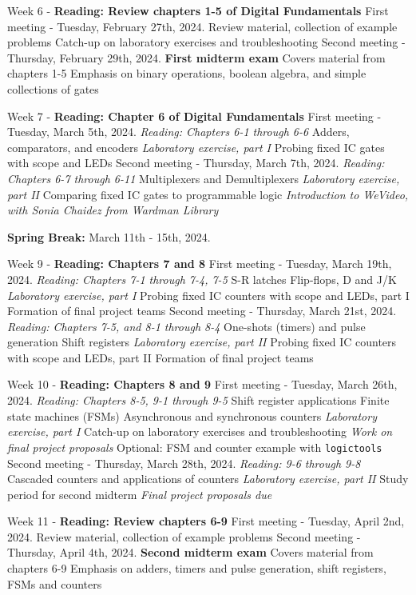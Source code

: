 \documentclass[10pt]{article}
\begin{document}
\begin{outline}[enumerate]
\1 Week 6 - \textbf{Reading: Review chapters 1-5 of Digital Fundamentals}
\2 First meeting - Tuesday, February 27th, 2024.
\3 Review material, collection of example problems
\3 Catch-up on laboratory exercises and troubleshooting
\2 Second meeting - Thursday, February 29th, 2024.
\3 \textbf{First midterm exam}
\4 Covers material from chapters 1-5
\4 Emphasis on binary operations, boolean algebra, and simple collections of gates

\1 Week 7 - \textbf{Reading: Chapter 6 of Digital Fundamentals}
\2 First meeting - Tuesday, March 5th, 2024. \textit{Reading: Chapters 6-1 through 6-6}
\3 Adders, comparators, and encoders
\3 \textit{Laboratory exercise, part I}
\4 Probing fixed IC gates with scope and LEDs
\2 Second meeting - Thursday, March 7th, 2024. \textit{Reading: Chapters 6-7 through 6-11}
\3 Multiplexers and Demultiplexers
\3 \textit{Laboratory exercise, part II}
\4 Comparing fixed IC gates to programmable logic
\4 \textit{Introduction to WeVideo, with Sonia Chaidez from Wardman Library}

\1 \textbf{Spring Break:} March 11th - 15th, 2024.

\1 Week 9 - \textbf{Reading: Chapters 7 and 8}
\2 First meeting - Tuesday, March 19th, 2024. \textit{Reading: Chapters 7-1 through 7-4, 7-5}
\3 S-R latches
\3 Flip-flops, D and J/K
\3 \textit{Laboratory exercise, part I}
\4 Probing fixed IC counters with scope and LEDs, part I
\4 Formation of final project teams
\2 Second meeting - Thursday, March 21st, 2024. \textit{Reading: Chapters 7-5, and 8-1 through 8-4}
\3 One-shots (timers) and pulse generation
\3 Shift registers
\3 \textit{Laboratory exercise, part II}
\4 Probing fixed IC counters with scope and LEDs, part II
\4 Formation of final project teams

\1 Week 10 - \textbf{Reading: Chapters 8 and 9}
\2 First meeting - Tuesday, March 26th, 2024. \textit{Reading: Chapters 8-5, 9-1 through 9-5}
\3 Shift register applications
\3 Finite state machines (FSMs)
\3 Asynchronous and synchronous counters
\3 \textit{Laboratory exercise, part I}
\4 Catch-up on laboratory exercises and troubleshooting
\4 \textit{Work on final project proposals}
\4 Optional: FSM and counter example with \verb+logictools+
\2 Second meeting - Thursday, March 28th, 2024. \textit{Reading: 9-6 through 9-8}
\3 Cascaded counters and applications of counters
\3 \textit{Laboratory exercise, part II}
\4 Study period for second midterm
\4 \textit{Final project proposals due}

\1 Week 11 - \textbf{Reading: Review chapters 6-9}
\2 First meeting - Tuesday, April 2nd, 2024.
\3 Review material, collection of example problems
\2 Second meeting - Thursday, April 4th, 2024.
\3 \textbf{Second midterm exam}
\4 Covers material from chapters 6-9
\4 Emphasis on adders, timers and pulse generation, shift registers, FSMs and counters


\end{outline}
\end{document}
